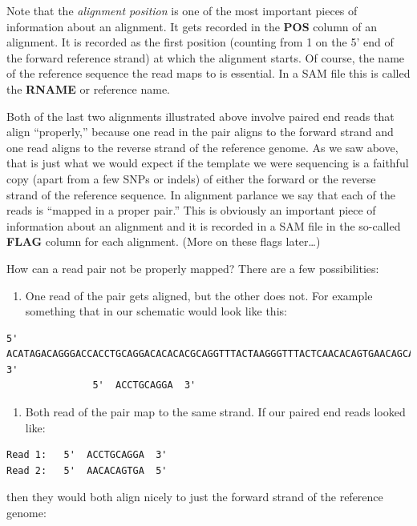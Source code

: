 \documentclass[]{krantz}
\providecommand{\tightlist}{%
  \setlength{\itemsep}{0pt}\setlength{\parskip}{0pt}}
\begin{document}
Note that the \emph{alignment position} is one of the most important pieces of information
about an alignment. It gets recorded in the \textbf{POS} column of an alignment. It is recorded as the
first position (counting from 1 on the 5' end of the forward reference strand) at which
the alignment starts. Of course, the name of the reference sequence the read maps to is
essential. In a SAM file this is called the \textbf{RNAME} or reference name.

Both of the last two alignments illustrated above involve paired end reads that align
``properly,'' because one read in the pair aligns to the forward strand and one read
aligns to the reverse strand of the reference genome. As we saw above, that is just what
we would expect if the template we were sequencing is a faithful copy (apart from a few SNPs
or indels) of either the forward or the reverse strand of the reference sequence. In alignment
parlance we say that each of the reads is ``mapped in a proper pair.'' This is obviously
an important piece of information about an alignment and it is recorded in a SAM file
in the so-called \textbf{FLAG} column for each alignment. (More on these flags later\ldots{})

How can a read pair not be properly mapped? There are a few possibilities:

\begin{enumerate}
\def\labelenumi{(\arabic{enumi})}
\tightlist
\item
  One read of the pair gets aligned, but the other does not. For example something
  that in our schematic would look like this:
\end{enumerate}

\begin{verbatim}
5'  ACATAGACAGGGACCACCTGCAGGACACACACGCAGGTTTACTAAGGGTTTACTCAACACAGTGAACAGCATATACCAGA  3'
               5'  ACCTGCAGGA  3'
\end{verbatim}

\begin{enumerate}
\def\labelenumi{(\arabic{enumi})}
\setcounter{enumi}{1}
\tightlist
\item
  Both read of the pair map to the same strand. If our paired end reads looked like:
\end{enumerate}

\begin{verbatim}
Read 1:   5'  ACCTGCAGGA  3'
Read 2:   5'  AACACAGTGA  5'
\end{verbatim}

then they would both align nicely to just the forward strand of the reference genome:
\end{document}
